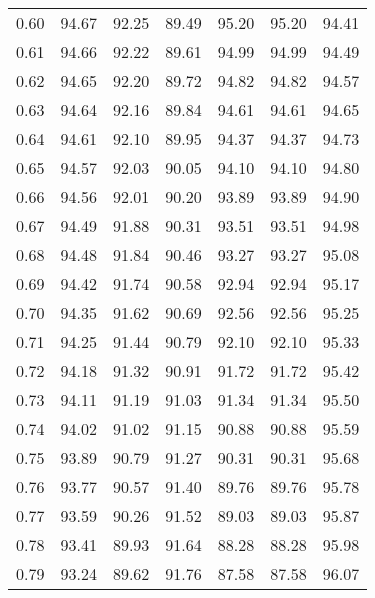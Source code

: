 \begin{tabular}{|c|c|c|c|c|c|c|}
      0.60 &     94.67 &     92.25 &      89.49 &   95.20 &      95.20 &         94.41 \\
      0.61 &     94.66 &     92.22 &      89.61 &   94.99 &      94.99 &         94.49 \\
      0.62 &     94.65 &     92.20 &      89.72 &   94.82 &      94.82 &         94.57 \\
      0.63 &     94.64 &     92.16 &      89.84 &   94.61 &      94.61 &         94.65 \\
      0.64 &     94.61 &     92.10 &      89.95 &   94.37 &      94.37 &         94.73 \\
      0.65 &     94.57 &     92.03 &      90.05 &   94.10 &      94.10 &         94.80 \\
      0.66 &     94.56 &     92.01 &      90.20 &   93.89 &      93.89 &         94.90 \\
      0.67 &     94.49 &     91.88 &      90.31 &   93.51 &      93.51 &         94.98 \\
      0.68 &     94.48 &     91.84 &      90.46 &   93.27 &      93.27 &         95.08 \\
      0.69 &     94.42 &     91.74 &      90.58 &   92.94 &      92.94 &         95.17 \\
      0.70 &     94.35 &     91.62 &      90.69 &   92.56 &      92.56 &         95.25 \\
      0.71 &     94.25 &     91.44 &      90.79 &   92.10 &      92.10 &         95.33 \\
      0.72 &     94.18 &     91.32 &      90.91 &   91.72 &      91.72 &         95.42 \\
      0.73 &     94.11 &     91.19 &      91.03 &   91.34 &      91.34 &         95.50 \\
      0.74 &     94.02 &     91.02 &      91.15 &   90.88 &      90.88 &         95.59 \\
      0.75 &     93.89 &     90.79 &      91.27 &   90.31 &      90.31 &         95.68 \\
      0.76 &     93.77 &     90.57 &      91.40 &   89.76 &      89.76 &         95.78 \\
      0.77 &     93.59 &     90.26 &      91.52 &   89.03 &      89.03 &         95.87 \\
      0.78 &     93.41 &     89.93 &      91.64 &   88.28 &      88.28 &         95.98 \\
      0.79 &     93.24 &     89.62 &      91.76 &   87.58 &      87.58 &         96.07 \\

\end{tabular}
